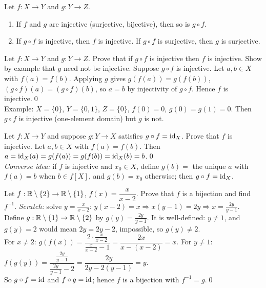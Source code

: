 \begin{result}[Composition]
Let $f:X\to Y$ and $g:Y\to Z$.
\begin{enumerate}
\item If $f$ and $g$ are injective (surjective, bijective), then so is $g\circ f$.
\item If $g\circ f$ is injective, then $f$ is injective. \quad If $g\circ f$ is surjective, then $g$ is surjective.
\end{enumerate}
\end{result}

\begin{hexample}
Let $f:X\to Y$ and $g:Y\to Z$. Prove that if $g\circ f$ is injective then $f$ is injective. Show by example that $g$ need not be injective.
\solution
Suppose $g\circ f$ is injective. Let $a,b\in X$ with $f(a)=f(b)$. Applying $g$ gives $g(f(a))=g(f(b))$, \ie $(g\circ f)(a)=(g\circ f)(b)$, so $a=b$ by injectivity of $g\circ f$. Hence $f$ is injective.\qed\\
Example: $X=\{0\}$, $Y=\{0,1\}$, $Z=\{0\}$, $f(0)=0$, $g(0)=g(1)=0$. Then $g\circ f$ is injective (one-element domain) but $g$ is not.
\end{hexample}

\begin{hexample}
Let $f:X\to Y$ and suppose $g:Y\to X$ satisfies $g\circ f=\mathrm{id}_X$. Prove that $f$ is injective.
\solution
Let $a,b\in X$ with $f(a)=f(b)$. Then $a=\mathrm{id}_X(a)=g(f(a))=g(f(b))=\mathrm{id}_X(b)=b$.\qed\\
\emph{Converse idea:} if $f$ is injective and $x_0\in X$, define $g(b)=$ the unique $a$ with $f(a)=b$ when $b\in f[X]$, and $g(b)=x_0$ otherwise; then $g\circ f=\mathrm{id}_X$.
\end{hexample}

\begin{hexample}
Let $f:\mathbb{R}\setminus\{2\}\to\mathbb{R}\setminus\{1\}$, $f(x)=\dfrac{x}{x-2}$. Prove that $f$ is a bijection and find $f^{-1}$.
\solution
\emph{Scratch:} solve $y=\frac x{x-2}$: $y(x-2)=x\Rightarrow x(y-1)=2y\Rightarrow x=\frac{2y}{y-1}$.\\
Define $g:\mathbb{R}\setminus\{1\}\to\mathbb{R}\setminus\{2\}$ by $g(y)=\frac{2y}{y-1}$. It is well-defined: $y\neq1$, and $g(y)=2$ would mean $2y=2y-2$, impossible, so $g(y)\neq2$.\\
For $x\neq2$: $g(f(x))=\dfrac{2\cdot\frac x{x-2}}{\frac x{x-2}-1}=\dfrac{2x}{x-(x-2)}=x$. \quad For $y\neq1$: $f(g(y))=\dfrac{\frac{2y}{y-1}}{\frac{2y}{y-1}-2}=\dfrac{2y}{2y-2(y-1)}=y$.\\
So $g\circ f=\mathrm{id}$ and $f\circ g=\mathrm{id}$; hence $f$ is a bijection with $f^{-1}=g$.\qed
\end{hexample}

